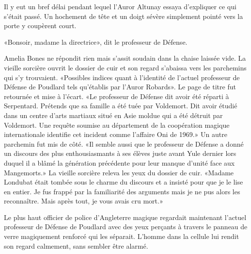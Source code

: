 Il y eut un bref délai pendant lequel l'Auror Altunay essaya d'expliquer ce qui s'était passé. Un hochement de tête et un doigt sévère simplement pointé vers la porte y coupèrent court.

«Bonsoir, madame la directrice», dit le professeur de Défense.

Amelia Bones ne répondit rien mais s'assit soudain dans la chaise laissée vide. La vieille sorcière ouvrit le dossier de cuir et son regard s'abaissa vers les parchemins qui s'y trouvaient. «Possibles indices quant à l'identité de l'actuel professeur de Défense de Poudlard tels qu'établis par l'Auror Robards». Le page de titre fut retournée et mise à l'écart. «Le professeur de Défense dit avoir été réparti à Serpentard. Prétends que sa famille a été tuée par Voldemort. Dit avoir étudié dans un centre d'arts martiaux situé en Asie moldue qui a été détruit par Voldemort. Une requête soumise au département de la coopération magique internationale identifie cet incident comme l'affaire Oni de 1969.» Un autre parchemin fut mis de côté. «Il semble aussi que le professeur de Défense a donné un discours des plus enthousiasmants à ses élèves juste avant Yule dernier lors duquel il a blâmé la génération précédente pour leur manque d'unité face aux Mangemorts.» La vieille sorcière releva les yeux du dossier de cuir. «Madame Londubat était tombée sous le charme du discours et a insisté pour que je le lise en entier. Je fus frappé par la familiarité des arguments mais je ne pus alors les reconnaître. Mais après tout, je vous avais cru mort.»

Le plus haut officier de police d'Angleterre magique regardait maintenant l'actuel professeur de Défense de Poudlard avec des yeux perçants à travers le panneau de verre magiquement renforcé qui les séparait. L'homme dans la cellule lui rendit son regard calmement, sans sembler être alarmé.

